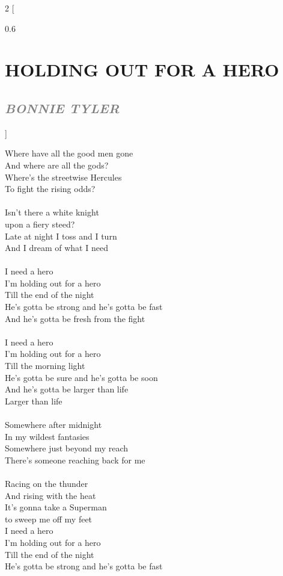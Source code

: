 \documentclass[100pt,a4paper]{report}
\newenvironment{song2}[2]
	{	
    	\begin{multicols*}{2}
		[
			\begin{spacing}{0.6}
				\section*{\LARGE\centering \MakeUppercase{\textbf{{#1}}}}
				\subsection*{\Large\centering \textit{\textcolor{gray}{\MakeUppercase{{#2}}}}}
			\end{spacing}
		]
		\Large
	}
	{
	\end{multicols*}
	\newpage
    }
\begin{document}
\begin{song2}{holding out for a hero}{bonnie tyler}
\noindent
Where have all the good men gone\\
And where are all the gods?\\
Where's the streetwise Hercules\\
To fight the rising odds?\\
\\
Isn't there a white knight\\ 
upon a fiery steed?\\
Late at night I toss and I turn\\
And I dream of what I need\\
\\
I need a hero\\
I'm holding out for a hero\\
Till the end of the night\\
He's gotta be strong and he's gotta be fast\\
And he's gotta be fresh from the fight\\
\\
I need a hero\\
I'm holding out for a hero\\
Till the morning light\\
He's gotta be sure and he's gotta be soon\\
And he's gotta be larger than life\\
Larger than life\\
\\
Somewhere after midnight\\
In my wildest fantasies\\
Somewhere just beyond my reach\\
There's someone reaching back for me\\
\\
Racing on the thunder\\
And rising with the heat\\
It's gonna take a Superman\\ 
to sweep me off my feet\\
\vfill
\columnbreak
\noindent
I need a hero\\
I'm holding out for a hero\\
Till the end of the night\\
He's gotta be strong and he's gotta be fast\\

\end{song2}
\end{document}

